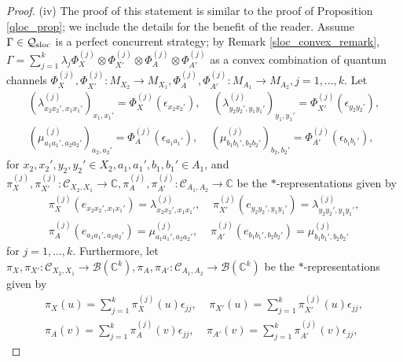 \documentclass[11pt]{amsart}
\newcommand{\cl}[1]{\mathcal{#1}}
\newcommand{\bb}[1]{\mathbb{#1}}
\begin{document}
\begin{proof}
(iv) The proof of this statement is similar to the proof of Proposition \ref{qloc_prop}; we include the details for the benefit of the reader. Assume $\Gamma \in \cl{Q}_{\rm sloc}$ is a perfect concurrent strategy; by Remark \ref{sloc_convex_remark}, $\Gamma = \sum_{j=1}^{k}\lambda_{j}\Phi_{X}^{(j)}\otimes \Phi_{X'}^{(j)}\otimes\Phi_{A}^{(j)}\otimes \Phi_{A'}^{(j)}$ as a convex combination of quantum channels $\Phi_{X}^{(j)}, \Phi_{X'}^{(j)}: M_{X_{2}}\rightarrow M_{X_{1}}, \Phi_{A}^{(j)}, \Phi_{A'}^{(j)}: M_{A_{1}}\rightarrow M_{A_{2}}, j = 1, \hdots, k$. Let 
\begin{gather*}
	(\lambda_{x_{2}x_{2}', x_{1}x_{1}'}^{(j)})_{x_{1}, x_{1}'} = \Phi_{X}^{(j)}(\epsilon_{x_{2}x_{2}'}), \;\;\;\; (\lambda_{y_{2}y_{2}', y_{1}y_{1}'}^{(j)})_{y_{1}, y_{1}'} = \Phi_{X'}^{(j)}(\epsilon_{y_{2}y_{2}'}),  \\
	(\mu_{a_{1}a_{1}', a_{2}a_{2}'}^{(j)})_{a_{2}, a_{2}'} = \Phi_{A}^{(j)}(\epsilon_{a_{1}a_{1}'}), \;\;\;\; (\mu_{b_{1}b_{1}', b_{2}b_{2}'}^{(j)})_{b_{2}, b_{2}'} = \Phi_{A'}^{(j)}(\epsilon_{b_{1}b_{1}'}),
\end{gather*}
\noindent for $x_{2}, x_{2}', y_{2}, y_{2}' \in X_{2}, a_{1}, a_{1}', b_{1}, b_{1}' \in A_{1}$, and $\pi_{X}^{(j)}, \pi_{X'}^{(j)}: \cl{C}_{X_{2}, X_{1}}\rightarrow \bb{C}, \pi_{A}^{(j)}, \pi_{A'}^{(j)}: \cl{C}_{A_{1}, A_{2}}\rightarrow \bb{C}$ be the $*$-representations given by
\begin{gather*}
	\pi_{X}^{(j)}(e_{x_{2}x_{2}', x_{1}x_{1}'}) = \lambda_{x_{2}x_{2}', x_{1}x_{1}'}^{(j)}, \;\;\;\; \pi_{X'}^{(j)}(e_{y_{2}y_{2}', y_{1}y_{1}'}) = \lambda_{y_{2}y_{2}', y_{1}y_{1}'}^{(j)}, 
\\ 	\pi_{A}^{(j)}(e_{a_{1}a_{1}', a_{2}a_{2}'}) = \mu_{a_{1}a_{1}', a_{2}a_{2}'}^{(j)}, \;\;\;\; \pi_{A'}^{(j)}(e_{b_{1}b_{1}', b_{2}b_{2}'}) = \mu_{b_{1}b_{1}', b_{2}b_{2}'}^{(j)}
\end{gather*}
\noindent for $j = 1, \hdots, k$. Furthermore, let $\pi_{X}, \pi_{X'}: \cl{C}_{X_{2}, X_{1}}\rightarrow \cl{B}(\bb{C}^{k}), \pi_{A}, \pi_{A'}: \cl{C}_{A_{1}, A_{2}}\rightarrow \cl{B}(\bb{C}^{k})$ be the $*$-representations given by
\begin{gather*}
	\pi_{X}(u) = \sum\limits_{j=1}^{k}\pi_{X}^{(j)}(u)\epsilon_{jj}, \;\;\;\; \pi_{X'}(u) = \sum\limits_{j=1}^{k}\pi_{X'}^{(j)}(u)\epsilon_{jj}, 
\\ 	\pi_{A}(v) = \sum\limits_{j=1}^{k}\pi_{A}^{(j)}(v)\epsilon_{jj}, \;\;\;\; \pi_{A'}(v) = \sum\limits_{j=1}^{k}\pi_{A'}^{(j)}(v)\epsilon_{jj},
\end{gather*}

\end{proof}
\end{document}
